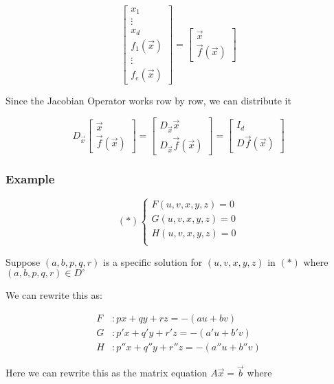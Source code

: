 \documentclass[11 pt, twoside]{article}
\begin{document}
$$\left[\begin{array}{c}
x_1 \\
\vdots \\
x_d \\
f_1 (\vec{x})\\
\vdots \\
f_e (\vec{x})
\end{array}\right] =
\left[\begin{array}{c}
\vec{x}\\
\vec{f}(\vec{x})
\end{array}\right]$$

Since the Jacobian Operator works row by row, we can distribute it

$$D_{\vec{x}} \left[\begin{array}{c}
\vec{x}\\
\vec{f}(\vec{x})
\end{array}\right] =
\left[\begin{array}{c}
D_{\vec{x}} \vec{x} \\
D_{\vec{x}} \vec{f}(\vec{x})
\end{array}\right] =
\left[\begin{array}{c}
I_d \\
D \vec{f}(\vec{x})
\end{array}\right]$$
\subsubsection{Example}
\[(*)
\begin{cases}
F(u, v, x, y, z) = 0 \\
G(u, v, x, y, z) = 0 \\
H(u, v, x, y, z) = 0 \\
\end{cases}
\]

Suppose $(a, b, p, q, r)$ is a specific solution for $(u, v, x, y, z)$ in $(*)$
where $(a, b, p, q, r) \in D^\circ$

We can rewrite this as:

\begin{align*}
F&: px + qy + rz = -(au + bv) \\
G&: p'x + q'y + r'z = -(a'u + b'v) \\
H&: p''x + q''y + r''z = -(a''u + b''v)
\end{align*}

Here we can rewrite this as the matrix equation $A\vec{x} = \vec{b}$ where
\end{document}

